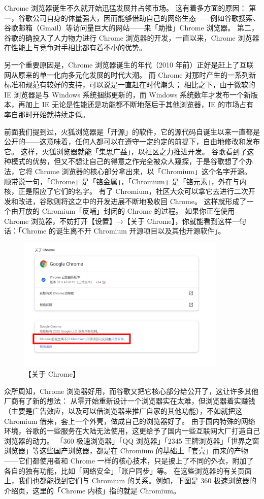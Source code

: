 Chrome 浏览器诞生不久就开始迅猛发展并占领市场。
这有着多方面的原因：
第一，谷歌公司自身的体量强大，因而能够借助自己的网络生态——例如谷歌搜索、谷歌邮箱（Gmail）等访问量巨大的网站——来「助推」Chrome 浏览器。
第二，谷歌的确投入了人力物力进行 Chrome 浏览器的开发，一直以来，Chrome 浏览器在性能上与竞争对手相比都有着不小的优势。

\begin{note}
  另一个重要原因是，Chrome 浏览器诞生的年代（2010 年前）正好是赶上了互联网从原来的单一化向多元化发展的时代大潮。
  而 Chrome 对那时产生的一系列新标准和规范有较好的支持，可以说是一直赶在时代潮头；
  相比之下，由于微软的 IE 浏览器是与 Windows 系统捆绑更新的，而 Windows 系统数年才发布一个新版本，再加上 IE 无论是性能还是功能都不断地落后于其他浏览器，IE 的市场占有率自那时开始就持续走低。
\end{note}

前面我们提到过，火狐浏览器是「开源」的软件，它的源代码自诞生以来一直都是公开的——这意味着，任何人都可以在遵守一定约定的前提下，自由地修改和发布它。
这样，火狐浏览器就能「集思广益」，以社区之力推进开发。
谷歌看到了这种模式的优势，但又不想让自己的得意之作完全被众人窥探，于是谷歌想了个办法，它将 Chrome 浏览器的核心部分拿出来，以「Chromium」这个名字开源。
顺带说一句，「Chrome」是「铬金属」，「Chromium」是「铬元素」，外在与内核，正是照应了它们的名字。
有了 Chromium，社区大众可以拿它去进行二次开发和改进，谷歌则将这之中的开发进展不断地吸收回 Chrome。
这样就形成了一个由开放的 Chromium「反哺」封闭的 Chrome 的过程。
如果你正在使用 Chrome 浏览器，不妨打开【设置】→【关于 Chrome】，你就能看到这样一句话：「Chrome 的诞生离不开 Chromium 开源项目以及其他开源软件」。

\begin{figure}[htb!]
  \centering
  \includegraphics[width=10cm]{assets/About_chrome.png}
  \caption{【关于 Chrome】}
  \label{About_chrome}
\end{figure}

众所周知，Chrome 浏览器好用，而谷歌又把它核心部分给公开了，这让许多其他厂商有了新的想法：
从零开始重新设计一个浏览器实在太难，但浏览器着实赚钱（主要是广告效应，以及可以借浏览器来推广自家的其他功能），不如就把这 Chromium 借来，套上一个外壳，做成自己的浏览器好了。
由于国内特殊的网络环境，谷歌的一些服务在大陆无法使用，这更给予了国内一些互联网大厂打造自己浏览器的动力。
「360 极速浏览器」「QQ 浏览器」「2345 王牌浏览器」「世界之窗浏览器」等这些国产浏览器，都是在 Chromium 的基础上「套壳」而来的产物
——它们都使用者和 Chrome 一样的核心技术，只是披上了不同的外衣，附加了各自的独有功能，比如「网络安全」「账户同步」等。
在这些浏览器的有关页面上，我们也都能找到它们与 Chromium 的关系。例如，下图是 360 极速浏览器的介绍页，这里的「Chrome 内核」指的就是 Chromium。

